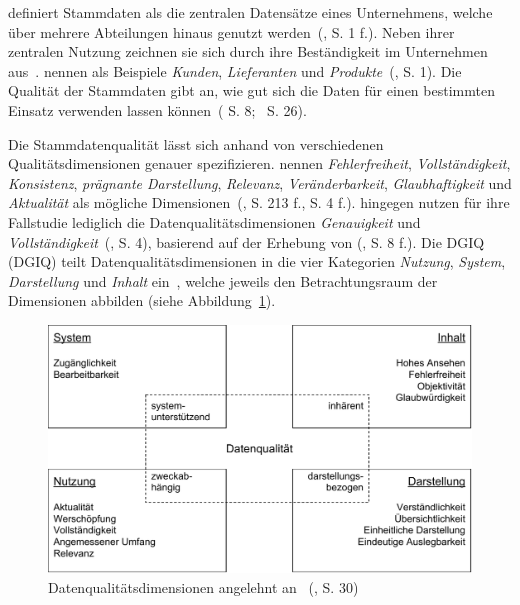 \documentclass[
  language=german, %
  type=bachelor,%
  ngerman
]{isthesis}
\begin{document}
\begin{content}
	\textsc{\citeauthor{otto2012design}} definiert Stammdaten als die zentralen
	Datensätze eines Unternehmens, welche über mehrere Abteilungen hinaus genutzt
	werden~(\citeyear{otto2012design}, S.  1 f.).  Neben ihrer zentralen Nutzung
	zeichnen sie sich durch ihre Beständigkeit im Unternehmen aus~\cite[][S.
	1]{knolmayer2006quality}.  \textsc{\citeauthor{knolmayer2006quality}} nennen
	als Beispiele \textit{Kunden}, \textit{Lieferanten} und
	\textit{Produkte}~(\citeyear{knolmayer2006quality}, S. 1). Die Qualität der
	Stammdaten gibt an, wie gut sich die Daten für einen bestimmten Einsatz
	verwenden lassen können~(\citeauthor{otto2011stammdatenmanagement}
	\citeyear{otto2011stammdatenmanagement} S.
	8;~\citeauthor{hinrichs2002datenqualitatsmanagement}
	\citeyear{hinrichs2002datenqualitatsmanagement} S. 26).

	Die Stammdatenqualität lässt sich anhand von verschiedenen
	Qualitätsdimensionen genauer spezifizieren.
	\textsc{\citeauthor{pipino2002data}} nennen \zB{} \textit{Fehlerfreiheit},
	\textit{Vollständigkeit}, \textit{Konsistenz}, \textit{prägnante
	Darstellung}, \textit{Relevanz}, \textit{Veränderbarkeit},
	\textit{Glaubhaftigkeit} und \textit{Aktualität} als mögliche
	Dimensionen~(\citeyear{pipino2002data, legner2007stammdaten}, S. 213 f., S. 4
	f.). \textsc{\citeauthor{baghi2013controlling}} hingegen nutzen für ihre
	Fallstudie lediglich die Datenqualitätsdimensionen \textit{Genauigkeit} und
	\textit{Vollständigkeit}~(\citeyear{baghi2013controlling}, S. 4), basierend
	auf der Erhebung von
	\textsc{\citeauthor{wand1996anchoring}} (\citeyear{wand1996anchoring}, S. 8
	f.). Die \acrlong{DGIQ} (\acrshort{DGIQ}) teilt Datenqualitätsdimensionen in
	die vier Kategorien \textit{Nutzung}, \textit{System}, \textit{Darstellung}
	und \textit{Inhalt} ein~\cite[][S. 29 - 31]{rohweder2015informationsqualitat},
	welche jeweils den Betrachtungsraum der Dimensionen abbilden (siehe
	Abbildung~\ref{15-dimensions}).

  \begin{figure}
    \includegraphics[scale=0.75]{content/figures/15-dimensions}
    \caption[Datenqualitätsdimensionen]{Datenqualitätsdimensionen angelehnt an~\textsc{\citeauthor{rohweder2015informationsqualitat}} (\citeyear{rohweder2015informationsqualitat}, S. 30)}\label{15-dimensions}
  \end{figure}


\end{content}
\end{document}
